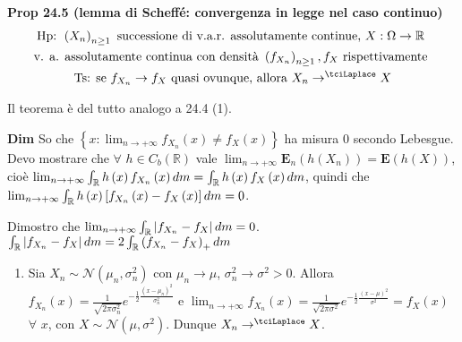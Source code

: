 \documentclass{article}
\begin{document}
\textbf{Prop 24.5 (lemma di Scheff\'{e}: convergenza in legge nel caso
continuo)} 
\begin{gather*}
\text{Hp}\text{: }\left( X_{n}\right) _{n\geq 1}\text{ successione di v.a.r.
assolutamente continue, }X:\Omega \rightarrow 
\mathbb{R}
\text{ } \\
\text{v. a. assolutamente continua con densit\`{a} }\left( f_{X_{n}}\right)
_{n\geq 1},f_{X}\text{ rispettivamente } \\
\text{Ts}\text{: }\text{se }f_{X_{n}}\rightarrow f_{X}\text{ quasi ovunque,
allora }X_{n}\rightarrow ^{\tciLaplace }X
\end{gather*}

Il teorema \`{e} del tutto analogo a 24.4 (1).

\textbf{Dim} So che $\left\{ x:\lim_{n\rightarrow +\infty }f_{X_{n}}\left(
x\right) \neq f_{X}\left( x\right) \right\} $ ha misura $0$ secondo
Lebesgue. Devo mostrare che $\forall $ $h\in C_{b}\left( 
\mathbb{R}
\right) $ vale $\lim_{n\rightarrow +\infty }\mathbf{E}_{n}\left( h\left(
X_{n}\right) \right) =\mathbf{E}\left( h\left( X\right) \right) $, cio\`{e} $%
\lim_{n\rightarrow +\infty }\int_{%
\mathbb{R}
}h\left( x\right) f_{X_{n}}\left( x\right) dm=\int_{%
\mathbb{R}
}h\left( x\right) f_{X}\left( x\right) dm$, quindi che $\lim_{n\rightarrow
+\infty }\int_{%
\mathbb{R}
}h\left( x\right) \left[ f_{X_{n}}\left( x\right) -f_{X}\left( x\right) %
\right] dm=0$.

Dimostro che $\lim_{n\rightarrow +\infty }\int_{%
\mathbb{R}
}\left\vert f_{X_{n}}-f_{X}\right\vert dm=0$. $\int_{%
\mathbb{R}
}\left\vert f_{X_{n}}-f_{X}\right\vert dm=2\int_{%
\mathbb{R}
}\left( f_{X_{n}}-f_{X}\right) _{+}dm$

\begin{enumerate}
\item Sia $X_{n}\sim \mathcal{N}\left( \mu _{n},\sigma _{n}^{2}\right) $ con 
$\mu _{n}\rightarrow \mu $, $\sigma _{n}^{2}\rightarrow \sigma ^{2}>0$.
Allora $f_{X_{n}}\left( x\right) =\frac{1}{\sqrt{2\pi \sigma _{n}^{2}}}e^{-%
\frac{1}{2}\frac{\left( x-\mu _{n}\right) ^{2}}{\sigma _{n}^{2}}}$ e $%
\lim_{n\rightarrow +\infty }f_{X_{n}}\left( x\right) =\frac{1}{\sqrt{2\pi
\sigma ^{2}}}e^{-\frac{1}{2}\frac{\left( x-\mu \right) ^{2}}{\sigma ^{2}}%
}=f_{X}\left( x\right) $ $\forall $ $x$, con $X\sim \mathcal{N}\left( \mu
,\sigma ^{2}\right) $. Dunque $X_{n}\rightarrow ^{\tciLaplace }X$.
\end{enumerate}
\end{document}
